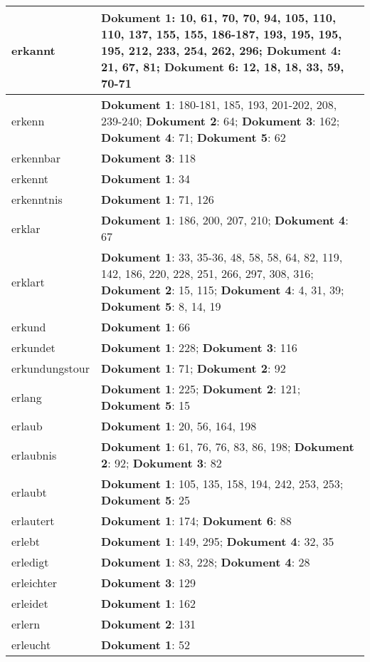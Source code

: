 \documentclass[a5paper]{article}
\begin{document}
\begin{longtable}[l]{|l|p{3in}|}
\hline
erkannt & \textbf{Dokument 1}: 10, 61, 70, 70, 94, 105, 110, 110, 137, 155, 155, 186-187, 193, 195, 195, 195, 212, 233, 254, 262, 296; \textbf{Dokument 4}: 21, 67, 81; \textbf{Dokument 6}: 12, 18, 18, 33, 59, 70-71 \\
\hline
erkenn & \textbf{Dokument 1}: 180-181, 185, 193, 201-202, 208, 239-240; \textbf{Dokument 2}: 64; \textbf{Dokument 3}: 162; \textbf{Dokument 4}: 71; \textbf{Dokument 5}: 62 \\
\hline
erkennbar & \textbf{Dokument 3}: 118 \\
\hline
erkennt & \textbf{Dokument 1}: 34 \\
\hline
erkenntnis & \textbf{Dokument 1}: 71, 126 \\
\hline
erklar & \textbf{Dokument 1}: 186, 200, 207, 210; \textbf{Dokument 4}: 67 \\
\hline
erklart & \textbf{Dokument 1}: 33, 35-36, 48, 58, 58, 64, 82, 119, 142, 186, 220, 228, 251, 266, 297, 308, 316; \textbf{Dokument 2}: 15, 115; \textbf{Dokument 4}: 4, 31, 39; \textbf{Dokument 5}: 8, 14, 19 \\
\hline
erkund & \textbf{Dokument 1}: 66 \\
\hline
erkundet & \textbf{Dokument 1}: 228; \textbf{Dokument 3}: 116 \\
\hline
erkundungstour & \textbf{Dokument 1}: 71; \textbf{Dokument 2}: 92 \\
\hline
erlang & \textbf{Dokument 1}: 225; \textbf{Dokument 2}: 121; \textbf{Dokument 5}: 15 \\
\hline
erlaub & \textbf{Dokument 1}: 20, 56, 164, 198 \\
\hline
erlaubnis & \textbf{Dokument 1}: 61, 76, 76, 83, 86, 198; \textbf{Dokument 2}: 92; \textbf{Dokument 3}: 82 \\
\hline
erlaubt & \textbf{Dokument 1}: 105, 135, 158, 194, 242, 253, 253; \textbf{Dokument 5}: 25 \\
\hline
erlautert & \textbf{Dokument 1}: 174; \textbf{Dokument 6}: 88 \\
\hline
erlebt & \textbf{Dokument 1}: 149, 295; \textbf{Dokument 4}: 32, 35 \\
\hline
erledigt & \textbf{Dokument 1}: 83, 228; \textbf{Dokument 4}: 28 \\
\hline
erleichter & \textbf{Dokument 3}: 129 \\
\hline
erleidet & \textbf{Dokument 1}: 162 \\
\hline
erlern & \textbf{Dokument 2}: 131 \\
\hline
erleucht & \textbf{Dokument 1}: 52 \\

\end{longtable}
\end{document}
